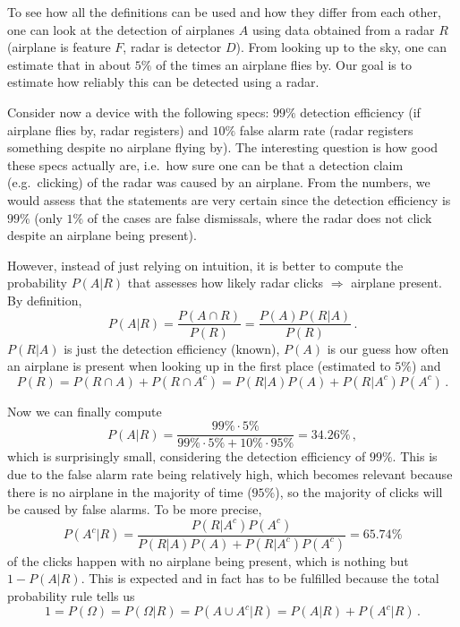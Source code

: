 \begin{ex}[Radar]
To see how all the definitions can be used and how they differ from each other, one can look at the detection of airplanes $A$ using data obtained from a radar $R$ (airplane is feature $F$, radar is detector $D$). From looking up to the sky, one can estimate that in about $5\%$ of the times an airplane flies by. Our goal is to estimate how reliably this can be detected using a radar.


Consider now a device with the following specs: $99\%$ detection efficiency (if airplane flies by, radar registers) and $10\%$ false alarm rate (radar registers something despite no airplane flying by). The interesting question is how good these specs actually are, i.e.~how sure one can be that a detection claim (e.g.~clicking) of the radar was caused by an airplane. From the numbers, we would assess that the statements are very certain since the detection efficiency is $99\%$ (only $1\%$ of the cases are false dismissals, where the radar does not click despite an airplane being present).

However, instead of just relying on intuition, it is better to compute the probability $P(A | R)$ that assesses how likely radar clicks $\Rightarrow$ airplane present. By definition,
\begin{equation*}
P(A | R) = \frac{P(A \cap R)}{P(R)} = \frac{P(A) P(R | A)}{P(R)} \, .
\end{equation*}
$P(R | A)$ is just the detection efficiency (known), $P(A)$ is our guess how often an airplane is present when looking up in the first place (estimated to $5\%$) and%
\begin{equation*}
P(R) = P(R \cap A) + P(R \cap A^c) = P(R | A) P(A) + P(R | A^c) P(A^c) \, .
\end{equation*}

Now we can finally compute
\begin{equation*}
P(A | R) = \frac{99\% \cdot 5\%}{99\% \cdot 5\% + 10\% \cdot 95\%} = 34.26\% \, ,
\end{equation*}
which is surprisingly small, considering the detection efficiency of $99\%$. This is due to the false alarm rate being relatively high, which becomes relevant because there is no airplane in the majority of time ($95\%$), so the majority of clicks will be caused by false alarms. To be more precise,
\begin{equation*}
P(A^c | R) = \frac{P(R | A^c) P(A^c)}{P(R | A) P(A) + P(R | A^c) P(A^c)} = 65.74\%
\end{equation*}
of the clicks happen with no airplane being present, which is nothing but $1 - P(A | R)$. This is expected and in fact has to be fulfilled because the total probability rule tells us
\begin{equation*}
1 = P(\Omega) = P(\Omega | R) = P(A \cup A^c | R) = P(A | R) + P(A^c | R) \, .
\end{equation*}
\end{ex}



